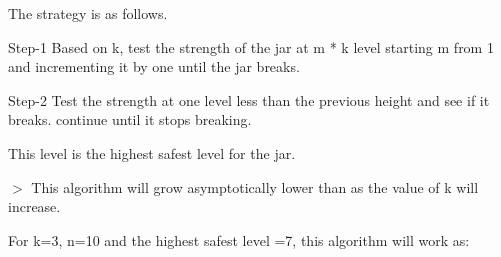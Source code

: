 \documentclass[letterpaper,portrait,12pt]{article}
\begin{document}
\begin{flushleft}

\end{flushleft}


\begin{flushleft}

\end{flushleft}


\begin{flushleft}
The strategy is as follows.
\end{flushleft}


\begin{flushleft}

\end{flushleft}


\begin{flushleft}
Step-1 Based on k, test the strength of the jar at m * k level starting m from 1 and incrementing it by one until the jar breaks.
\end{flushleft}


\begin{flushleft}

\end{flushleft}


\begin{flushleft}
Step-2 Test the strength at one level less than the previous height and see if it breaks. continue until it stops breaking.
\end{flushleft}


\begin{flushleft}

\end{flushleft}


\begin{flushleft}
This level is the highest safest level for the jar.
\end{flushleft}


\begin{flushleft}

\end{flushleft}


\begin{flushleft}
$>$ This algorithm will grow asymptotically lower than as the value of k will increase.
\end{flushleft}


\begin{flushleft}

\end{flushleft}


\begin{flushleft}
For k=3, n=10 and the highest safest level =7, this algorithm will work as:
\end{flushleft}
\end{document}

